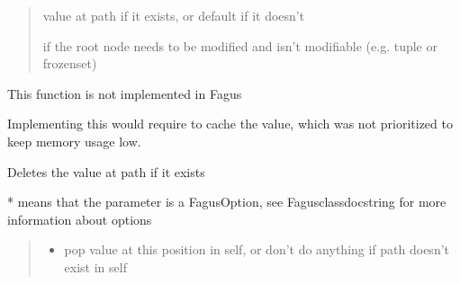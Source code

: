 \documentclass[a4paper,10pt,english]{sphinxmanual}
\begin{document}
\begin{fulllineitems}
\begin{fulllineitems}
\begin{quote}
\begin{description}
\begin{itemize}
\end{itemize}

\sphinxAtStartPar
value at path if it exists, or default if it doesn’t

\sphinxAtStartPar
{} \textendash{} if the root node needs to be modified and isn’t modifiable (e.g. tuple or frozenset)

\end{description}\end{quote}

\end{fulllineitems}


\begin{fulllineitems}
\label{\detokenize{fagus.fagus:fagus.fagus.Fagus.popitem}}
\pysigstartsignatures
{}
\pysigstopsignatures
\sphinxAtStartPar
This function is not implemented in Fagus

\sphinxAtStartPar
Implementing this would require to cache the value, which was not prioritized to keep memory usage low.

\end{fulllineitems}


\begin{fulllineitems}
\label{\detokenize{fagus.fagus:fagus.fagus.Fagus.discard}}
\pysigstartsignatures
{}
\pysigstopsignatures
\sphinxAtStartPar
Deletes the value at path if it exists

\sphinxAtStartPar
* means that the parameter is a FagusOption, see Fagus\sphinxhyphen{}class\sphinxhyphen{}docstring for more information about options
\begin{quote}\begin{description}
\begin{itemize}
\item {}
\sphinxAtStartPar
{} \textendash{} pop value at this position in self, or don’t do anything if path doesn’t exist in self


\end{itemize}
\end{description}
\end{quote}
\end{fulllineitems}
\end{fulllineitems}
\end{document}
